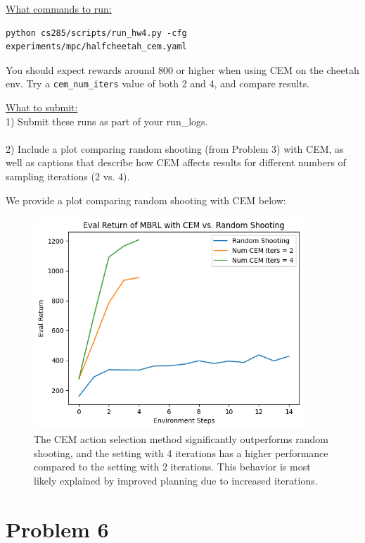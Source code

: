 \documentclass{article} %
\begin{document}
\underline{What commands to run:}
\begin{lstlisting}[escapechar=@]
python cs285/scripts/run_hw4.py -cfg experiments/mpc/halfcheetah_cem.yaml
\end{lstlisting}

You should expect rewards around 800 or higher when using CEM on the cheetah env. Try a \verb+cem_num_iters+ value of both 2 and 4, and compare results.

\underline{What to submit:}\\
1) Submit these runs as part of your run\_logs.\\ \\
2) Include a plot comparing random shooting (from Problem 3) with CEM, as well as captions that describe how CEM affects results for different numbers of sampling iterations (2 vs. 4).

\begin{sol}
  We provide a plot comparing random shooting with CEM below:
  \begin{figure}[ht!]
    \color{darkblue}
    \begin{center}
      \includegraphics[width=4in]{images/q5/cem.png}
    \end{center}
    \caption{The CEM action selection method significantly outperforms random shooting, and the setting with 4 iterations has a higher performance compared to the setting with 2 iterations. This behavior is most likely explained by improved planning due to increased iterations.}
  \end{figure}
\end{sol}

\newpage
\section*{Problem 6}
\end{document}
